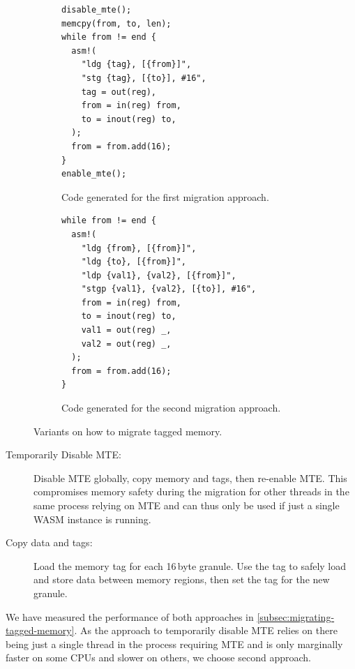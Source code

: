 \begin{figure}[h]
  \centering
  \begin{subfigure}[T]{0.45\textwidth}
    \centering
    \begin{lstlisting}[frame=h,style=customc,label={lst:migrating-memory-disable}]
disable_mte();
memcpy(from, to, len);
while from != end {
  asm!(
    "ldg {tag}, [{from}]",
    "stg {tag}, [{to}], #16",
    tag = out(reg),
    from = in(reg) from,
    to = inout(reg) to,
  );
  from = from.add(16);
}
enable_mte();
    \end{lstlisting}
    \caption{Code generated for the first migration approach.}
    \label{fig:migrating-memory-disable}
  \end{subfigure}
  \hfill
  \begin{subfigure}[T]{0.45\textwidth}
    \centering
    \begin{lstlisting}[frame=h,style=customc,label={lst:migrating-memory-tags}]
while from != end {
  asm!(
    "ldg {from}, [{from}]",
    "ldg {to}, [{from}]",
    "ldp {val1}, {val2}, [{from}]",
    "stgp {val1}, {val2}, [{to}], #16",
    from = in(reg) from,
    to = inout(reg) to,
    val1 = out(reg) _,
    val2 = out(reg) _,
  );
  from = from.add(16);
}
    \end{lstlisting}
    \caption{Code generated for the second migration approach.}
    \label{fig:migrating-memory-tags}
  \end{subfigure}
  \caption{Variants on how to migrate tagged memory.}
  \label{fig:migrating-memory}
\end{figure}

\begin{description}
  \item[Temporarily Disable \ac{MTE}:]
  Disable \ac{MTE} globally, copy memory and tags, then re-enable \ac{MTE}.
  This compromises memory safety during the migration for other threads in the same process relying on \ac{MTE} and can thus only be used if just a single \ac{WASM} instance is running.

  \item[Copy data and tags:]
  Load the memory tag for each 16\,byte granule.
  Use the tag to safely load and store data between memory regions, then set the tag for the new granule.

\end{description}

\noindent
We have measured the performance of both approaches in \cref{subsec:migrating-tagged-memory}.
As the approach to temporarily disable \ac{MTE} relies on there being just a single thread in the process requiring \ac{MTE} and is only marginally faster on some CPUs and slower on others, we choose second approach.

